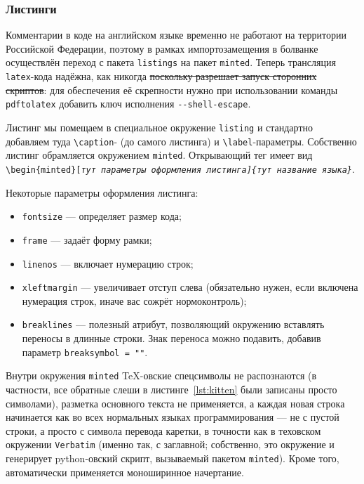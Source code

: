 \documentclass[14pt, russian]{scrartcl}
\begin{document}
\subsubsection{Листинги}

Комментарии в коде на английском языке временно не работают на территории Российской Федерации, поэтому в рамках импортозамещения в болванке осуществлён переход с пакета \texttt{listings} на пакет \texttt{minted}. Теперь трансляция \texttt{latex}-кода надёжна, как никогда \sout{поскольку разрешает запуск сторонних скриптов}: для обеспечения её скрепности нужно при использовании команды \texttt{pdftolatex} добавить ключ исполнения \texttt{-{}-shell-escape}. 

Листинг мы помещаем в специальное окружение \texttt{listing} и стандартно добавляем туда \texttt{\textbackslash caption}- (до самого листинга) и \texttt{\textbackslash label}-параметры. Собственно листинг обрамляется окружением \texttt{minted}. Открывающий тег имеет вид \texttt{\textbackslash begin\{minted\}[\itshape{тут параметры оформления листинга}]\{\itshape{тут название языка}\}}.

Некоторые параметры оформления листинга:
\begin{itemize}
\item \texttt{fontsize} --- определяет размер кода;
\item \texttt{frame} --- задаёт форму рамки;
\item \texttt{linenos} --- включает нумерацию строк;
\item \texttt{xleftmargin} --- увеличивает отступ слева (обязательно нужен, если включена нумерация строк, иначе вас сожрёт нормоконтроль);
\item \texttt{breaklines} --- полезный атрибут, позволяющий окружению вставлять переносы в длинные строки. Знак переноса можно подавить, добавив параметр \texttt{breaksymbol = "{}"{}}.
\end{itemize}

Внутри окружения \texttt{minted} \TeX-овские спецсимволы не распознаются (в частности, все обратные слеши в листинге~\ref{lst:kitten} были записаны просто символами), разметка основного текста не применяется, а каждая новая строка начинается как во всех нормальных языках программирования --- не с пустой строки, а просто с символа перевода каретки, в точности как в теховском окружении \texttt{Verbatim} (именно так, с заглавной; собственно, это окружение и генерирует python-овский скрипт, вызываемый пакетом \texttt{minted}). Кроме того, автоматически применяется моноширинное начертание.
\end{document}
